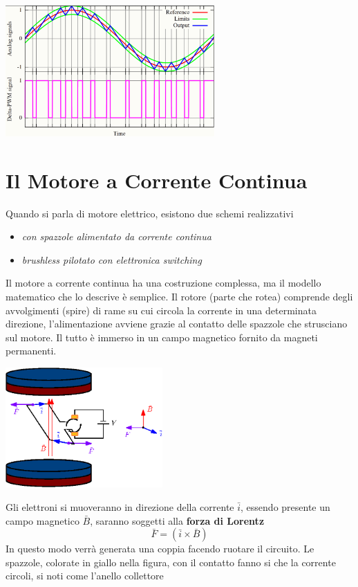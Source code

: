 \documentclass[10pt, letterpaper]{report}
\begin{document}
\begin{center}
    \includegraphics[width=0.6\textwidth ]{images/DeltaPWM.png}
\end{center}
\flowerLine 
\section{Il Motore a Corrente Continua}
Quando si parla di motore elettrico, esistono due schemi realizzativi\begin{itemize}
    \item \textit{con spazzole alimentato da corrente continua} 
    \item \textit{brushless pilotato con elettronica switching}
\end{itemize}
Il motore a corrente continua ha una costruzione complessa, ma il modello matematico che lo descrive è semplice. Il rotore (parte che rotea) comprende degli avvolgimenti (spire) di rame su cui circola la corrente in una determinata direzione, l'alimentazione avviene grazie al contatto delle spazzole che strusciano sul motore. Il tutto è immerso in un campo magnetico fornito da magneti permanenti.\begin{center}
    \includegraphics[width=0.45\textwidth ]{images/motore1.eps}
\end{center}
Gli elettroni si muoveranno in direzione della corrente $\bar i$, essendo presente un campo magnetico $\bar B$, saranno soggetti alla \textbf{forza di Lorentz} 
$$ \bar F = (\bar i \times \bar B)$$
In questo modo verrà generata una coppia facendo ruotare il circuito. Le spazzole, colorate in giallo nella figura, con il contatto fanno si che la corrente circoli, si noti come l'anello collettore 
\end{document}
